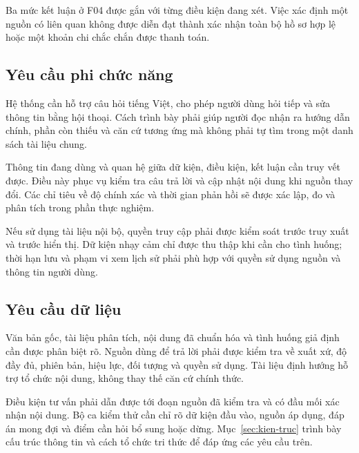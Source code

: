 Ba mức kết luận ở F04 được gắn với từng điều kiện đang xét. Việc xác định
một nguồn có liên quan không được diễn đạt thành xác nhận toàn bộ hồ sơ hợp
lệ hoặc một khoản chi chắc chắn được thanh toán.

\subsection{Yêu cầu phi chức năng}
Hệ thống cần hỗ trợ câu hỏi tiếng Việt, cho phép người dùng hỏi tiếp và sửa
thông tin bằng hội thoại. Cách trình bày phải giúp người đọc nhận ra hướng
dẫn chính, phần còn thiếu và căn cứ tương ứng mà không phải tự tìm trong
một danh sách tài liệu chung.

Thông tin đang dùng và quan hệ giữa dữ kiện, điều kiện, kết luận cần truy
vết được. Điều này phục vụ kiểm tra câu trả lời và cập nhật nội dung khi
nguồn thay đổi. Các chỉ tiêu về độ chính xác và thời gian phản hồi sẽ được
xác lập, đo và phân tích trong phần thực nghiệm.

Nếu sử dụng tài liệu nội bộ, quyền truy cập phải được kiểm soát trước truy
xuất và trước hiển thị. Dữ kiện nhạy cảm chỉ được thu thập khi cần cho tình
huống; thời hạn lưu và phạm vi xem lịch sử phải phù hợp với quyền sử dụng
nguồn và thông tin người dùng.

\subsection{Yêu cầu dữ liệu}
Văn bản gốc, tài liệu phân tích, nội dung đã chuẩn hóa và tình huống giả định
cần được phân biệt rõ. Nguồn dùng để trả lời phải được kiểm tra về xuất xứ,
độ đầy đủ, phiên bản, hiệu lực, đối tượng và quyền sử dụng. Tài liệu định
hướng hỗ trợ tổ chức nội dung, không thay thế căn cứ chính thức.

Điều kiện tư vấn phải dẫn được tới đoạn nguồn đã kiểm tra và có đầu mối
xác nhận nội dung. Bộ ca kiểm thử cần chỉ rõ dữ kiện đầu vào, nguồn áp dụng,
đáp án mong đợi và điểm cần hỏi bổ sung hoặc dừng. Mục~\ref{sec:kien-truc}
trình bày cấu trúc thông tin và cách tổ chức tri thức để đáp ứng các yêu
cầu trên.
